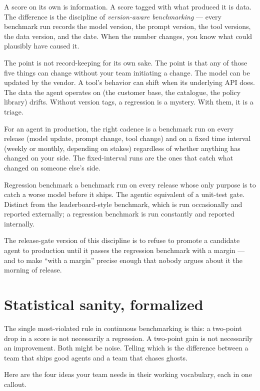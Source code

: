A score on its own is information. A score tagged with what produced it is data. The difference is the discipline of \textit{version-aware benchmarking} --- every benchmark run records the model version, the prompt version, the tool versions, the data version, and the date. When the number changes, you know what could plausibly have caused it.

The point is not record-keeping for its own sake. The point is that any of those five things can change without your team initiating a change. The model can be updated by the vendor. A tool's behavior can shift when its underlying API does. The data the agent operates on (the customer base, the catalogue, the policy library) drifts. Without version tags, a regression is a mystery. With them, it is a triage.

For an agent in production, the right cadence is a benchmark run on every release (model update, prompt change, tool change) and on a fixed time interval (weekly or monthly, depending on stakes) regardless of whether anything has changed on your side. The fixed-interval runs are the ones that catch what changed on someone else's side.

\begin{TNdefinition}{Regression benchmark} a benchmark run on every release whose only purpose is to catch a worse model before it ships. The agentic equivalent of a unit-test gate. Distinct from the leaderboard-style benchmark, which is run occasionally and reported externally; a regression benchmark is run constantly and reported internally. \end{TNdefinition}

The release-gate version of this discipline is to refuse to promote a candidate agent to production until it passes the regression benchmark with a margin --- and to make ``with a margin'' precise enough that nobody argues about it the morning of release.

\section{Statistical sanity, formalized}

The single most-violated rule in continuous benchmarking is this: a two-point drop in a score is not necessarily a regression. A two-point gain is not necessarily an improvement. Both might be noise. Telling which is the difference between a team that ships good agents and a team that chases ghosts.

Here are the four ideas your team needs in their working vocabulary, each in one callout.

